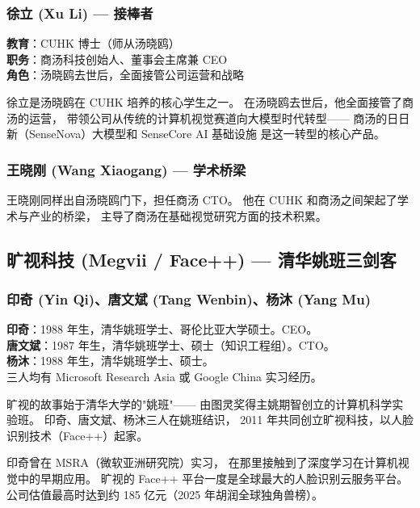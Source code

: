 \subsubsection{徐立 (Xu Li) — 接棒者}

\begin{keybox}[人物档案：徐立]
\textbf{教育}：CUHK 博士（师从汤晓鸥） \\
\textbf{职务}：商汤科技创始人、董事会主席兼 CEO \\
\textbf{角色}：汤晓鸥去世后，全面接管公司运营和战略
\end{keybox}

徐立是汤晓鸥在 CUHK 培养的核心学生之一。
在汤晓鸥去世后，他全面接管了商汤的运营，
带领公司从传统的计算机视觉赛道向大模型时代转型——
商汤的日日新（SenseNova）大模型和 SenseCore AI 基础设施
是这一转型的核心产品。

\subsubsection{王晓刚 (Wang Xiaogang) — 学术桥梁}

王晓刚同样出自汤晓鸥门下，担任商汤 CTO。
他在 CUHK 和商汤之间架起了学术与产业的桥梁，
主导了商汤在基础视觉研究方面的技术积累。


\subsection{旷视科技 (Megvii / Face++) — 清华姚班三剑客}

\subsubsection{印奇 (Yin Qi)、唐文斌 (Tang Wenbin)、杨沐 (Yang Mu)}

\begin{keybox}
\textbf{印奇}：1988 年生，清华姚班学士、哥伦比亚大学硕士。CEO。\\
\textbf{唐文斌}：1987 年生，清华姚班学士、硕士（知识工程组）。CTO。\\
\textbf{杨沐}：1988 年生，清华姚班学士、硕士。\\
三人均有 Microsoft Research Asia 或 Google China 实习经历。
\end{keybox}

旷视的故事始于清华大学的"姚班"——
由图灵奖得主姚期智创立的计算机科学实验班。
印奇、唐文斌、杨沐三人在姚班结识，
2011 年共同创立旷视科技，以人脸识别技术（Face++）起家。

印奇曾在 MSRA（微软亚洲研究院）实习，
在那里接触到了深度学习在计算机视觉中的早期应用。
旷视的 Face++ 平台一度是全球最大的人脸识别云服务平台。
公司估值最高时达到约 185 亿元（2025 年胡润全球独角兽榜）。

